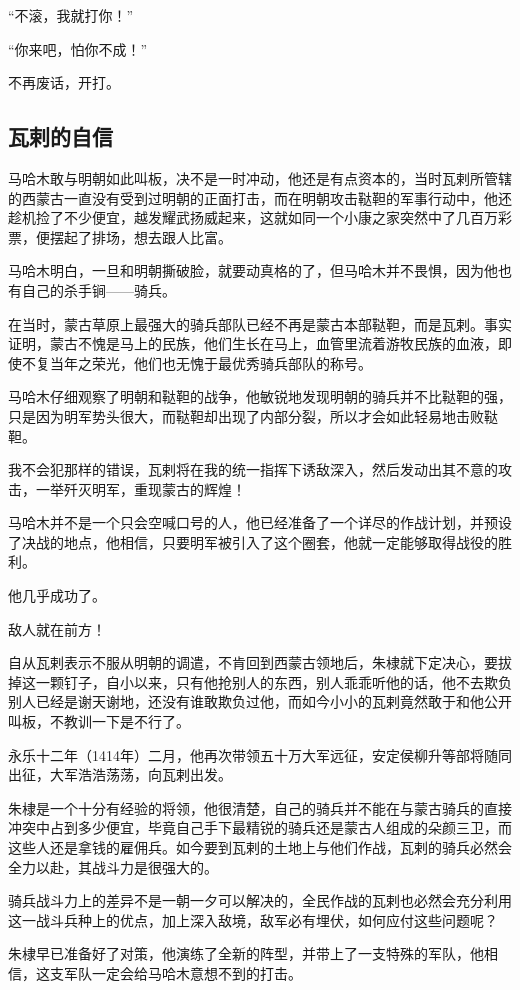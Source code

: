 \begin{multicols}{\theparacolNo}
“不滚，我就打你！”

“你来吧，怕你不成！”

不再废话，开打。

\subsection{瓦剌的自信}
马哈木敢与明朝如此叫板，决不是一时冲动，他还是有点资本的，当时瓦剌所管辖的西蒙古一直没有受到过明朝的正面打击，而在明朝攻击鞑靼的军事行动中，他还趁机捡了不少便宜，越发耀武扬威起来，这就如同一个小康之家突然中了几百万彩票，便摆起了排场，想去跟人比富。

马哈木明白，一旦和明朝撕破脸，就要动真格的了，但马哈木并不畏惧，因为他也有自己的杀手锏——骑兵。

在当时，蒙古草原上最强大的骑兵部队已经不再是蒙古本部鞑靼，而是瓦剌。事实证明，蒙古不愧是马上的民族，他们生长在马上，血管里流着游牧民族的血液，即使不复当年之荣光，他们也无愧于最优秀骑兵部队的称号。

马哈木仔细观察了明朝和鞑靼的战争，他敏锐地发现明朝的骑兵并不比鞑靼的强，只是因为明军势头很大，而鞑靼却出现了内部分裂，所以才会如此轻易地击败鞑靼。

我不会犯那样的错误，瓦剌将在我的统一指挥下诱敌深入，然后发动出其不意的攻击，一举歼灭明军，重现蒙古的辉煌！

马哈木并不是一个只会空喊口号的人，他已经准备了一个详尽的作战计划，并预设了决战的地点，他相信，只要明军被引入了这个圈套，他就一定能够取得战役的胜利。

他几乎成功了。

敌人就在前方！

自从瓦剌表示不服从明朝的调遣，不肯回到西蒙古领地后，朱棣就下定决心，要拔掉这一颗钉子，自小以来，只有他抢别人的东西，别人乖乖听他的话，他不去欺负别人已经是谢天谢地，还没有谁敢欺负过他，而如今小小的瓦剌竟然敢于和他公开叫板，不教训一下是不行了。

永乐十二年（1414年）二月，他再次带领五十万大军远征，安定侯柳升等部将随同出征，大军浩浩荡荡，向瓦剌出发。

朱棣是一个十分有经验的将领，他很清楚，自己的骑兵并不能在与蒙古骑兵的直接冲突中占到多少便宜，毕竟自己手下最精锐的骑兵还是蒙古人组成的朵颜三卫，而这些人还是拿钱的雇佣兵。如今要到瓦剌的土地上与他们作战，瓦剌的骑兵必然会全力以赴，其战斗力是很强大的。

骑兵战斗力上的差异不是一朝一夕可以解决的，全民作战的瓦剌也必然会充分利用这一战斗兵种上的优点，加上深入敌境，敌军必有埋伏，如何应付这些问题呢？

朱棣早已准备好了对策，他演练了全新的阵型，并带上了一支特殊的军队，他相信，这支军队一定会给马哈木意想不到的打击。


\end{multicols}
